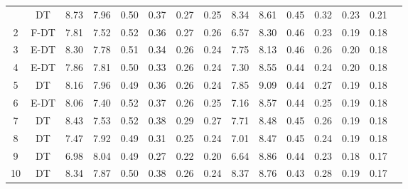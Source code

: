 \begin{longtable}{@{\hskip3pt}c@{\hskip3pt}c@{\hskip3pt}c@{\hskip3pt}c@{\hskip3pt}c@{\hskip3pt}c@{\hskip3pt}c@{\hskip3pt}c@{\hskip3pt}c@{\hskip3pt}c@{\hskip3pt}c@{\hskip3pt}c@{\hskip3pt}c@{\hskip3pt}c@{\hskip3pt}c}
\bottomrule
\endlastfoot
          1\label{tab:all-results-final} &             DT &              8.73 &        7.96 &          0.50 &        0.37 &        0.27 &         0.25 &                8.34 &        8.61 &          0.45 &        0.32 &        0.23 &         0.21 \\
          2 &           F-DT &              7.81 &        7.52 &          0.52 &        0.36 &        0.27 &         0.26 &                6.57 &        8.30 &          0.46 &        0.23 &        0.19 &         0.18 \\
          3 &           E-DT &              8.30 &        7.78 &          0.51 &        0.34 &        0.26 &         0.24 &                7.75 &        8.13 &          0.46 &        0.26 &        0.20 &         0.18 \\
          4 &           E-DT &              7.86 &        7.81 &          0.50 &        0.33 &        0.26 &         0.24 &                7.30 &        8.55 &          0.44 &        0.24 &        0.20 &         0.18 \\
          5 &             DT &              8.16 &        7.96 &          0.49 &        0.36 &        0.26 &         0.24 &                7.85 &        9.09 &          0.44 &        0.27 &        0.19 &         0.18 \\
          6 &           E-DT &              8.06 &        7.40 &          0.52 &        0.37 &        0.26 &         0.25 &                7.16 &        8.57 &          0.44 &        0.25 &        0.19 &         0.18 \\
          7 &             DT &              8.43 &        7.53 &          0.52 &        0.38 &        0.29 &         0.27 &                7.71 &        8.48 &          0.45 &        0.26 &        0.19 &         0.18 \\
          8 &             DT &              7.47 &        7.92 &          0.49 &        0.31 &        0.25 &         0.24 &                7.01 &        8.47 &          0.45 &        0.24 &        0.19 &         0.18 \\
          9 &             DT &              6.98 &        8.04 &          0.49 &        0.27 &        0.22 &         0.20 &                6.64 &        8.86 &          0.44 &        0.23 &        0.18 &         0.17 \\
         10 &             DT &              8.34 &        7.87 &          0.50 &        0.38 &        0.26 &         0.24 &                8.37 &        8.76 &          0.43 &        0.28 &        0.19 &         0.17 \\

\end{longtable}
